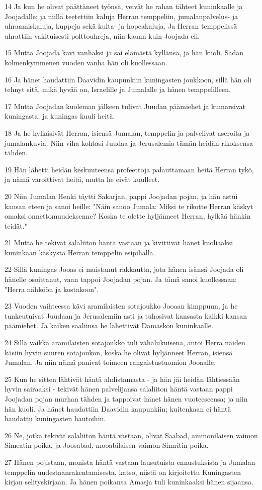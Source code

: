 \par 14 Ja kun he olivat päättäneet työnsä, veivät he rahan tähteet kuninkaalle ja Joojadalle; ja niillä teetettiin kaluja Herran temppeliin, jumalanpalvelus- ja uhraamiskaluja, kuppeja sekä kulta- ja hopeakaluja. Ja Herran temppelissä uhrattiin vakituisesti polttouhreja, niin kauan kuin Joojada eli.
\par 15 Mutta Joojada kävi vanhaksi ja sai elämästä kyllänsä, ja hän kuoli. Sadan kolmenkymmenen vuoden vanha hän oli kuollessaan.
\par 16 Ja hänet haudattiin Daavidin kaupunkiin kuningasten joukkoon, sillä hän oli tehnyt sitä, mikä hyvää on, Israelille ja Jumalalle ja hänen temppelilleen.
\par 17 Mutta Joojadan kuoleman jälkeen tulivat Juudan päämiehet ja kumarsivat kuningasta; ja kuningas kuuli heitä.
\par 18 Ja he hylkäsivät Herran, isiensä Jumalan, temppelin ja palvelivat aseroita ja jumalankuvia. Niin viha kohtasi Juudaa ja Jerusalemia tämän heidän rikoksensa tähden.
\par 19 Hän lähetti heidän keskuuteensa profeettoja palauttamaan heitä Herran tykö, ja nämä varoittivat heitä, mutta he eivät kuulleet.
\par 20 Niin Jumalan Henki täytti Sakarjan, pappi Joojadan pojan, ja hän astui kansan eteen ja sanoi heille: "Näin sanoo Jumala: Miksi te rikotte Herran käskyt omaksi onnettomuudeksenne? Koska te olette hyljänneet Herran, hylkää hänkin teidät."
\par 21 Mutta he tekivät salaliiton häntä vastaan ja kivittivät hänet kuoliaaksi kuninkaan käskystä Herran temppelin esipihalla.
\par 22 Sillä kuningas Jooas ei muistanut rakkautta, jota hänen isänsä Joojada oli hänelle osoittanut, vaan tappoi Joojadan pojan. Ja tämä sanoi kuollessaan: "Herra nähköön ja kostakoon".
\par 23 Vuoden vaihteessa kävi aramilaisten sotajoukko Jooaan kimppuun, ja he tunkeutuivat Juudaan ja Jerusalemiin asti ja tuhosivat kansasta kaikki kansan päämiehet. Ja kaiken saaliinsa he lähettivät Damaskon kuninkaalle.
\par 24 Sillä vaikka aramilaisten sotajoukko tuli vähälukuisena, antoi Herra näiden käsiin hyvin suuren sotajoukon, koska he olivat hyljänneet Herran, isiensä Jumalan. Ja niin nämä panivat toimeen rangaistustuomion Jooaalle.
\par 25 Kun he sitten lähtivät häntä ahdistamasta - ja hän jäi heidän lähtiessään hyvin sairaaksi - tekivät hänen palvelijansa salaliiton häntä vastaan pappi Joojadan pojan murhan tähden ja tappoivat hänet hänen vuoteeseensa; ja niin hän kuoli. Ja hänet haudattiin Daavidin kaupunkiin; kuitenkaan ei häntä haudattu kuningasten hautoihin.
\par 26 Ne, jotka tekivät salaliiton häntä vastaan, olivat Saabad, ammonilaisen vaimon Simeatin poika, ja Joosabad, mooabilaisen vaimon Simritin poika.
\par 27 Hänen pojistaan, monista häntä vastaan lausutuista ennustuksista ja Jumalan temppelin uudestaanrakentamisesta, katso, niistä on kirjoitettu Kuningasten kirjan selityskirjaan. Ja hänen poikansa Amasja tuli kuninkaaksi hänen sijaansa.

